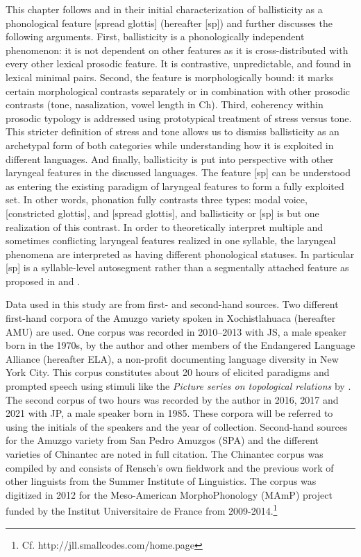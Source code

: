 \documentclass[output=paper]{langscibook}
\begin{document}
This chapter follows \citet{Silverman1994} and \citet{Zendejas2000} in their initial characterization of ballisticity as a phonological feature [spread glottis] (hereafter [sp]) and further discusses the following arguments. First, ballisticity is a phonologically independent phenomenon: it is not dependent on other features as it is cross-distributed with every other lexical prosodic feature. It is contrastive, unpredictable, and found in lexical minimal pairs. Second, the feature is morphologically bound: it marks certain morphological contrasts separately or in combination with other prosodic contrasts (tone, nasalization, vowel length in Ch). Third, coherency within prosodic typology is addressed using  prototypical treatment of stress versus tone. This stricter definition of stress and tone allows us to dismiss ballisticity as an archetypal form of both categories while understanding how it is exploited in different languages. And finally, ballisticity is put into perspective with other laryngeal features in the discussed languages. The feature [sp] can be understood as entering the existing paradigm of laryngeal features to form a fully exploited set. In other words, phonation fully contrasts three types: modal voice, [constricted glottis], and [spread glottis], and ballisticity or [sp] is but one realization of this contrast. In order to theoretically interpret multiple and sometimes conflicting laryngeal features realized in one syllable, the laryngeal phenomena are interpreted as having different phonological statuses. In particular [sp] is a syllable-level autosegment rather than a segmentally attached feature as proposed in \citet{Silverman1994} and  \citet{Zendejas2000}.  

Data used in this study are from first- and second-hand sources. Two different first-hand corpora of the Amuzgo variety spoken in Xochistlahuaca (hereafter AMU) are used. One corpus was recorded in 2010–2013 with JS, a male speaker born in the 1970s, by the author and other members of the Endangered Language Alliance (hereafter ELA), a non-profit documenting language diversity in New York City. This corpus constitutes about 20 hours of elicited paradigms and prompted speech using stimuli like the \textit{Picture series on topological relations} by \citet{BowermanPederson1992}. The second corpus of two hours was recorded by the author in 2016, 2017 and 2021 with JP, a male speaker born in 1985. These corpora will be referred to using the initials of the speakers and the year of collection. Second-hand sources for the Amuzgo variety from San Pedro Amuzgos (SPA) and the different varieties of Chinantec are noted in full citation. The Chinantec corpus was compiled by \citet{Rensch1968} and consists of Rensch’s own fieldwork and the previous work of other linguists from the Summer Institute of Linguistics. The corpus was digitized in 2012 for the Meso-American MorphoPhonology (MAmP) project funded by the Institut Universitaire de France from 2009-2014.\footnote{Cf. http://jll.smallcodes.com/home.page}
\end{document}
